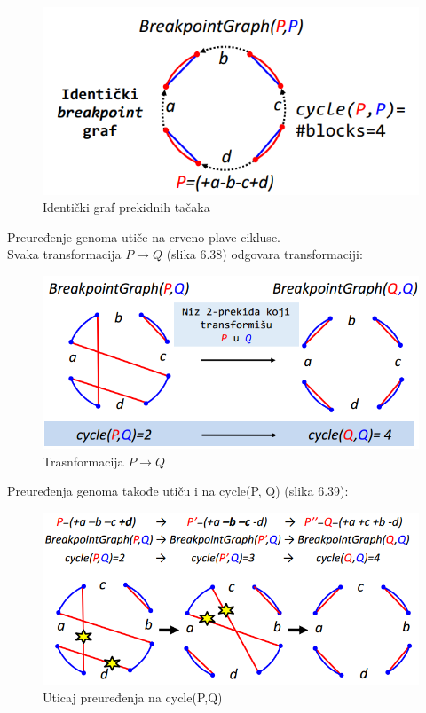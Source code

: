 \begin{figure}[h!]
\centering
\includegraphics[scale=0.6]{poglavlja/6/slike/identicki.PNG}
\caption{Identički graf prekidnih tačaka}
\label{slika:X}
\end{figure}
\newpage
Preuređenje genoma utiče na crveno-plave cikluse.\\

Svaka transformacija $P\rightarrow Q$ (slika 6.38) odgovara transformaciji:

\begin{figure}[h!]
\centering
\includegraphics[scale=0.7]{poglavlja/6/slike/transfBreakpoint.PNG}
\caption{Trasnformacija $P\rightarrow Q$ }
\label{slika:X}
\end{figure}

 Preuređenja genoma takođe utiču i na cycle(P, Q) (slika 6.39):

\begin{figure}[h!]
\centering
\includegraphics[scale=0.7]{poglavlja/6/slike/preuredjenja_cycle.PNG}
\caption{Uticaj preuređenja na cycle(P,Q)}
\label{slika:X}
\end{figure}

